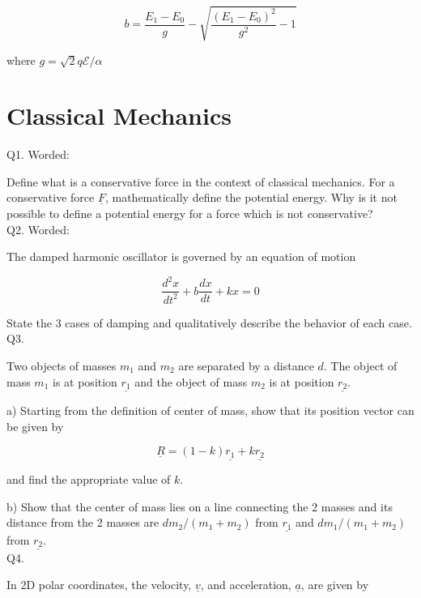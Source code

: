 \documentclass[a4paper,11pt]{article}
\begin{document}
\[ b = \frac{E_{1} - E_{0}}{g} - \sqrt{\frac{(E_{1} - E_{0})^{2}}{g^{2}} -1} \]

\noindent where \( g = \sqrt{2} q \mathcal{E} / {\alpha} \)

\section{Classical Mechanics}

\noindent Q1. Worded:

\noindent Define what is a conservative force in the context of classical mechanics. For a conservative force \( \underline{F} \), mathematically define the potential energy. Why is it not possible to define a potential energy for a force which is not conservative? \\

\noindent Q2. Worded:

\noindent The damped harmonic oscillator is governed by an equation of motion

\[
\frac{d^{2}x}{dt^{2}} + b\frac{dx}{dt}+kx=0
\]

State the 3 cases of damping and qualitatively describe the behavior of each case. \\

\noindent Q3. 

\noindent Two objects of masses \( m_{1} \) and \( m_{2} \) are separated by a distance \( d \). The object of mass \( m_{1} \) is at position \( \underline{r_{1}} \) and the object of mass \( m_{2} \) is at position \( \underline{r_{2}} \).

\medskip

\noindent a) Starting from the definition of center of mass, show that its position vector can be given by 

\[ \underline{R} = (1-k)\underline{r_{1}} + k\underline{r_{2}} \]

\noindent and find the appropriate value of \( k \). 

\medskip

\noindent b) Show that the center of mass lies on a line connecting the 2 masses and its distance from the 2 masses are \( d m_{2}/(m_{1}+m_{2}) \) from \( \underline{r_{1}} \) and \( d m_{1}/(m_{1}+m_{2}) \) from \( \underline{r_{2}} \). \\

\noindent Q4. 

\noindent In 2D polar coordinates, the velocity, \( \underline{v} \), and acceleration, \( \underline{a} \), are given by 
\end{document}
